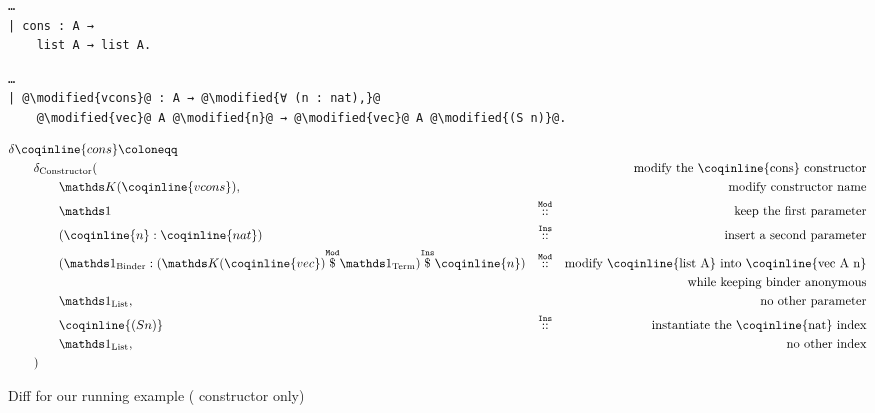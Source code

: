 \begin{figure*}[!htp]

  \noindent%
  \begin{minipage}[t]{0.50\textwidth}
    \begin{verbatim}
…
| cons : A →
    list A → list A.
  \end{verbatim}
\end{minipage}%
\begin{minipage}[t]{0.50\textwidth}
  \begin{verbatim}
…
| @\modified{vcons}@ : A → @\modified{∀ (n : nat),}@
    @\modified{vec}@ A @\modified{n}@ → @\modified{vec}@ A @\modified{(S n)}@.
  \end{verbatim}
\end{minipage}

  \vspace{2em}%

  \begin{align*}
& \delta\coqinline{cons} \coloneqq & && \\
& \qquad \delta_{\ConstructorText} (  & && \text{modify the \coqinline{cons} constructor} \\
& \qquad \qquad \MathReplace{\coqinline{vcons}}, & && \text{modify constructor name} \\
& \qquad \qquad \MathSame{} & \MathMod{}{} && \text{keep the first parameter} \\
& \qquad \qquad ( \coqinline{n} : \coqinline{nat} ) & \MathIns{}{} && \text{insert a second parameter} \\
& \qquad \qquad ( \MathSameBinder{} : \MathInsApp
  {(\MathModApp{\MathReplace{\coqinline{vec}}}{\MathSameTerm{}})}
  {\coqinline{n}}
) & \MathMod{}{}
  && \text{modify \coqinline{list A} into \coqinline{vec A n}} \\
& & && \text{while keeping binder anonymous} \\
& \qquad \qquad \MathSameList{}, & && \text{no other parameter} \\
& \qquad \qquad \coqinline{(S n)} & \MathIns{}{} && \text{instantiate the \coqinline{nat} index} \\
& \qquad \qquad \MathSameList{}, & && \text{no other index} \\
& \qquad ) && \\
  \end{align*}
  \caption{Diff for our running example ( constructor only)}\label{diff-list-vec-cons}
\end{figure*}

